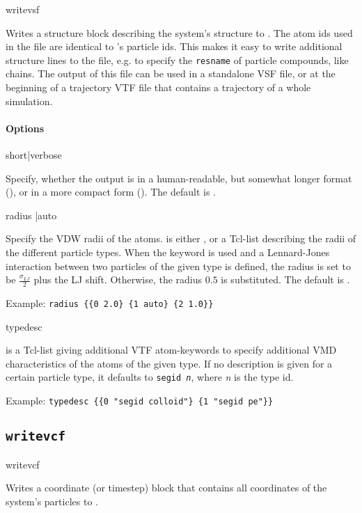 \begin{command}
  writevsf  
\end{command}
Writes a structure block describing the system's structure to
. The atom ids used in the file are identical to \es's
particle ids.  This makes it easy to write additional structure lines
to the file, e.g. to specify the \texttt{resname} of particle
compounds, like chains.  The output of this file can be used in a
standalone VSF file, or at the beginning of a trajectory VTF file that
contains a trajectory of a whole simulation.

\paragraph{Options}
\begin{options}
  short|verbose
\end{options}
Specify, whether the output is in a human-readable, but somewhat
longer format (), or in a more compact form
(). The default is .

\begin{options}
  radius |auto
\end{options}
Specify the VDW radii of the atoms.  is either
, or a Tcl-list describing the radii of the different
particle types. When the keyword  is used and a
Lennard-Jones interaction between two particles of the given type is
defined, the radius is set to be $\frac{\sigma_{LJ}}{2}$ plus the LJ
shift.  Otherwise, the radius $0.5$ is substituted. The default is
.  

Example: \verb!radius {{0 2.0} {1 auto} {2 1.0}}!

\begin{options}
  typedesc 
\end{options}
 is a Tcl-list giving additional VTF atom-keywords to
specify additional VMD characteristics of the atoms of the given type.
If no description is given for a certain particle type, it defaults to
\texttt{segid \textit{n}}, where \textit{n} is the type id.

Example: \verb!typedesc {{0 "segid colloid"} {1 "segid pe"}}!


\subsection{\texttt{writevcf}}
\begin{command}
  writevcf  
\end{command}
Writes a coordinate (or timestep) block that contains all coordinates
of the system's particles to .

